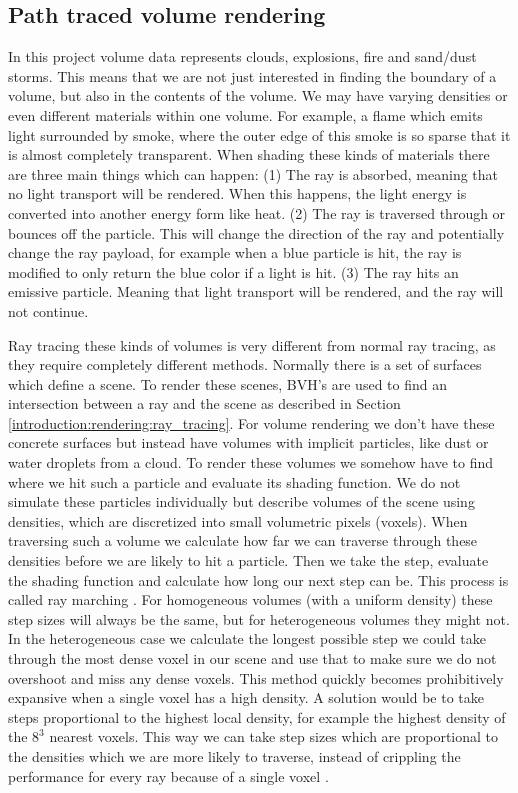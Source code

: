 \subsection{Path traced volume rendering} \label{introduction:path_traced_volume_rendering}
In this project volume data represents clouds, explosions, fire and sand/dust storms. This means that we are not just interested in finding the boundary of a volume, but also in the contents of the volume. We may have varying densities or even different materials within one volume. For example, a flame which emits light surrounded by smoke, where the outer edge of this smoke is so sparse that it is almost completely transparent. When shading these kinds of materials there are three main things which can happen: (1) The ray is absorbed, meaning that no light transport will be rendered. When this happens, the light energy is converted into another energy form like heat. (2) The ray is traversed through or bounces off the particle. This will change the direction of the ray and potentially change the ray payload, for example when a blue particle is hit, the ray is modified to only return the blue color if a light is hit. (3) The ray hits an emissive particle. Meaning that light transport will be rendered, and the ray will not continue.

Ray tracing these kinds of volumes is very different from normal ray tracing, as they require completely different methods. Normally there is a set of surfaces which define a scene. To render these scenes, BVH's are used to find an intersection between a ray and the scene as described in Section \ref{introduction:rendering:ray_tracing}. For volume rendering we don't have these concrete surfaces but instead have volumes with implicit particles, like dust or water droplets from a cloud. To render these volumes we somehow have to find where we hit such a particle and evaluate its shading function. We do not simulate these particles individually but describe volumes of the scene using densities, which are discretized into small volumetric pixels (voxels). When traversing such a volume we calculate how far we can traverse through these densities before we are likely to hit a particle. Then we take the step, evaluate the shading function and calculate how long our next step can be. This process is called ray marching \cite{RenderingWithTwoTriangles}. For homogeneous volumes (with a uniform density) these step sizes will always be the same, but for heterogeneous volumes they might not. In the heterogeneous case we calculate the longest possible step we could take through the most dense voxel in our scene and use that to make sure we do not overshoot and miss any dense voxels. This method quickly becomes prohibitively expansive when a single voxel has a high density. A solution would be to take steps proportional to the highest local density, for example the highest density of the $8^3$ nearest voxels. This way we can take step sizes which are proportional to the densities which we are more likely to traverse, instead of crippling the performance for every ray because of a single voxel \cite{kutz2017spectral}.


